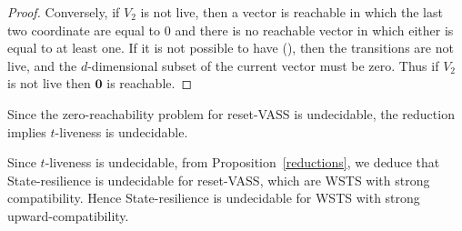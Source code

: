 \begin{proof}
Conversely, if $V_2$ is not live, then a vector is reachable in which the last two coordinate are equal to $0$ and there is no reachable vector in which either is equal to at least one.
If it is not possible to have (), then the transitions are not live, and the
$d$-dimensional subset of the current vector must be zero.
Thus if $V_2$ is not live then 
$\textbf{0}$ is reachable.
\end{proof}


Since the zero-reachability problem for reset-VASS is undecidable, the reduction implies 
%
%
{\sc %
$t$-liveness} is undecidable.

Since {\sc $t$-liveness} is undecidable, from Proposition~\ref{reductions},  we deduce that {\sc State-resilience} is undecidable  for reset-VASS, which are WSTS with strong compatibility. Hence {\sc State-resilience} is undecidable  for WSTS with strong upward-compatibility. %








